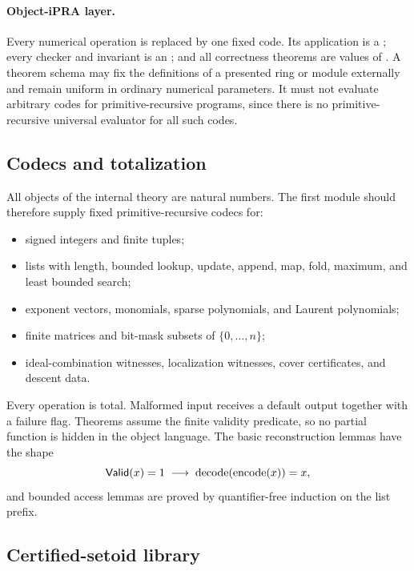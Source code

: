 \paragraph{Object-iPRA layer.}
Every numerical operation is replaced by one fixed  code.  Its application is a
; every checker and invariant is an ; and all correctness theorems are
values of .  A theorem schema may fix the definitions of a presented ring or module
externally and remain uniform in ordinary numerical parameters.  It must not evaluate arbitrary
codes for primitive-recursive programs, since there is no primitive-recursive universal evaluator
for all such codes.

\subsection{Codecs and totalization}

All objects of the internal theory are natural numbers.  The first module should therefore supply
fixed primitive-recursive codecs for:
\begin{itemize}
\item signed integers and finite tuples;
\item lists with length, bounded lookup, update, append, map, fold, maximum, and least bounded search;
\item exponent vectors, monomials, sparse polynomials, and Laurent polynomials;
\item finite matrices and bit-mask subsets of $\{0,\ldots,n\}$;
\item ideal-combination witnesses, localization witnesses, cover certificates, and descent data.
\end{itemize}
Every operation is total.  Malformed input receives a default output together with a failure flag.
Theorems assume the finite validity predicate, so no partial function is hidden in the object
language.  The basic reconstruction lemmas have the shape
\[
  \mathsf{Valid}(x)=1\;\longrightarrow\;
  \operatorname{decode}(\operatorname{encode}(x))=x,
\]
and bounded access lemmas are proved by quantifier-free induction on the list prefix.

\subsection{Certified-setoid library}

